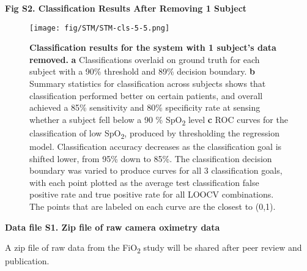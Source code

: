 \documentclass[12pt]{article}
\begin{document}
\newpage

\smallskip

\noindent
\textbf{Fig S2. Classification Results After Removing 1 Subject}

\smallskip

\begin{figure}[h]
\texttt{[image: fig/STM/STM-cls-5-5.png]}
\caption{\textbf{Classification results for the system with 1 subject's data removed.}
\textbf{a} Classifications overlaid on ground truth for each subject with a 90\% threshold and 89\% decision boundary. 
\textbf{b} Summary statistics for classification across subjects shows that classification performed better on certain patients, and overall achieved a 85\% sensitivity and 80\% specificity rate at sensing whether a subject fell below a 90 \% SpO\textsubscript{2} level
\textbf{c} ROC curves for the classification of low SpO\textsubscript{2}, produced by thresholding the regression model. Classification accuracy decreases as the classification goal is shifted lower, from 95\% down to 85\%. The classification decision boundary was varied to produce curves for all 3 classification goals, with each point plotted as the average test classification false positive rate and true positive rate for all LOOCV combinations. The points that are labeled on each curve are the closest to (0,1).
}
\label{cls-5}
\end{figure}

\smallskip

\noindent
\textbf{Data file S1. Zip file of raw camera oximetry data}

\noindent
A zip file of raw data from the FiO\textsubscript{2} study will be shared after peer review and publication.
\end{document}
